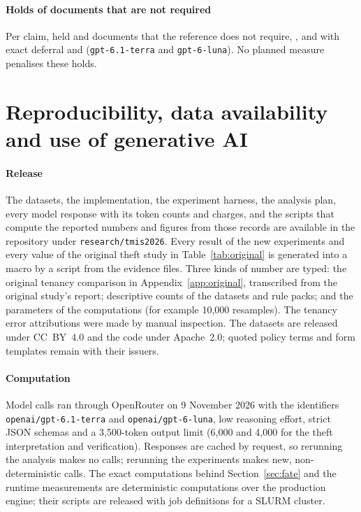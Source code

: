 \paragraph{Holds of documents that are not required}
Per claim,  held \tenTerraBoneHoldsNonreq{} and \tenLunaBoneHoldsNonreq{} documents that the reference does not require,  \tenTerraBtwoHoldsNonreq, and \casepath with exact deferral \tenTerraCPxHoldsNonreq{} and \tenLunaCPxHoldsNonreq{} (\texttt{gpt-6.1-terra} and \texttt{gpt-6-luna}). No planned measure penalises these holds.

\section{Reproducibility, data availability and use of generative AI}
\label{app:repro}

\paragraph{Release}
The datasets, the \casepath implementation, the experiment harness, the analysis plan, every model response with its token counts and charges, and the scripts that compute the reported numbers and figures from those records are available in the \casepath repository \cite{casepath2026repo} under \texttt{research/tmis2026}. Every result of the new experiments and every value of the original theft study in Table~\ref{tab:original} is generated into a macro by a script from the evidence files. Three kinds of number are typed: the original tenancy comparison in Appendix~\ref{app:original}, transcribed from the original study's report; descriptive counts of the datasets and rule packs; and the parameters of the computations (for example 10,000 resamples). The tenancy error attributions were made by manual inspection. The datasets are released under CC~BY~4.0 and the code under Apache~2.0; quoted policy terms and form templates remain with their issuers.

\paragraph{Computation}
Model calls ran through OpenRouter on 9 November 2026 with the identifiers \texttt{openai/gpt-6.1-terra} and \texttt{openai/gpt-6-luna}, low reasoning effort, strict JSON schemas and a 3,500-token output limit (6,000 and 4,000 for the theft interpretation and verification). Responses are cached by request, so rerunning the analysis makes no calls; rerunning the experiments makes new, non-deterministic calls. The exact computations behind Section~\ref{sec:fate} and the runtime measurements are deterministic computations over the production engine; their scripts are released with job definitions for a SLURM cluster.

